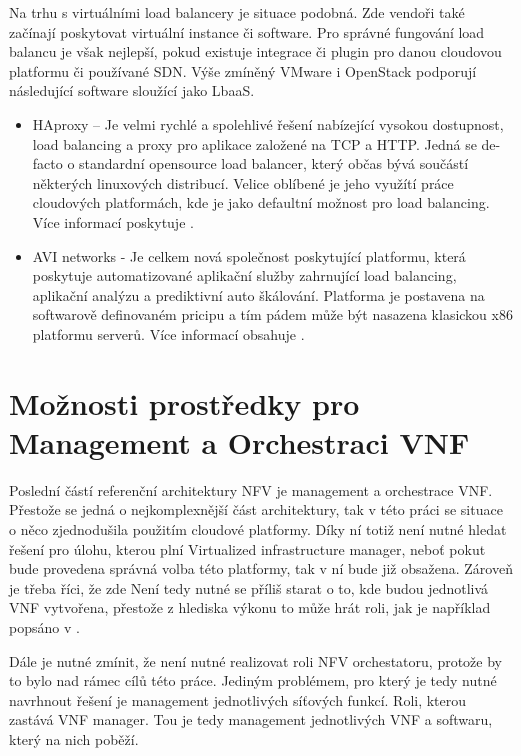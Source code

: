 Na trhu s virtuálními load balancery je situace podobná. Zde vendoři také začínají poskytovat virtuální instance či software. Pro správné fungování load balancu je však nejlepší, pokud existuje integrace či plugin pro danou cloudovou platformu či používané SDN. Výše zmíněný VMware i OpenStack podporují následující software sloužící jako LbaaS.

\begin{itemize}
\item HAproxy – Je velmi rychlé a spolehlivé řešení nabízející vysokou dostupnost, load balancing a proxy pro aplikace založené na TCP a HTTP. Jedná se de-facto o standardní opensource load balancer, který občas bývá součástí některých linuxových distribucí. Velice oblíbené je jeho využítí práce cloudových platformách, kde je jako defaultní možnost pro load balancing. Více informací poskytuje \cite{HAproxy} .
\item AVI networks - Je celkem nová společnost poskytující platformu, která poskytuje automatizované aplikační služby zahrnující load balancing, aplikační analýzu a prediktivní auto škálování. Platforma je postavena na softwarově definovaném pricipu a tím pádem může být nasazena klasickou x86 platformu serverů. Více informací obsahuje \cite{avi_networks} .
\end{itemize}

\section{Možnosti prostředky pro Management a Orchestraci VNF} \label{sec:MANO}

Poslední částí referenční architektury NFV je management a orchestrace VNF. Přestože se jedná o nejkomplexnější část architektury, tak v této práci se situace o něco zjednodušila použitím cloudové platformy. Díky ní totiž není nutné hledat řešení pro úlohu, kterou plní Virtualized infrastructure manager, neboť pokut bude provedena správná volba této platformy, tak v ní bude již obsažena. Zároveň je třeba říci, že zde Není tedy nutné se příliš starat o to, kde budou jednotlivá VNF vytvořena, přestože z hlediska výkonu to může hrát roli, jak je například popsáno v \cite{vnf_placement} .

Dále je nutné zmínit, že není nutné realizovat roli NFV orchestatoru, protože by to bylo nad rámec cílů této práce. Jediným problémem, pro který je tedy nutné navrhnout řešení je management jednotlivých síťových funkcí. Roli, kterou zastává VNF manager. Tou je tedy management jednotlivých VNF a softwaru, který na nich poběží.


